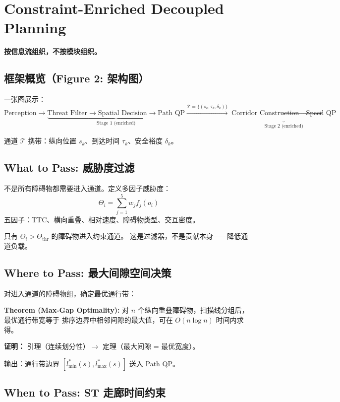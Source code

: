 \documentclass[a4paper,12pt]{article}
\begin{document}
\section{Constraint-Enriched Decoupled Planning}

\textbf{按信息流组织，不按模块组织。}

\subsection{框架概览（Figure 2: 架构图）}

一张图展示：
\[
\text{Perception} \to \underbrace{\text{Threat Filter} \to \text{Spatial Decision} \to \text{Path QP}}_{\text{Stage 1 (enriched)}}
\xrightarrow{\mathcal{T} = \{(s_k, \tau_k, \delta_k)\}}
\underbrace{\text{Corridor Construction} \to \text{Speed QP}}_{\text{Stage 2 (enriched)}}
\]

通道 $\mathcal{T}$ 携带：纵向位置 $s_k$、到达时间 $\tau_k$、安全裕度 $\delta_k$。

\subsection{What to Pass: 威胁度过滤}

不是所有障碍物都需要进入通道。定义多因子威胁度：
\[
\Theta_i = \sum_{j=1}^{5} w_j f_j(o_i)
\]
五因子：TTC、横向重叠、相对速度、障碍物类型、交互密度。

只有 $\Theta_i > \Theta_{\text{thr}}$ 的障碍物进入约束通道。
这是过滤器，不是贡献本身——降低通道负载。

\subsection{Where to Pass: 最大间隙空间决策}

对进入通道的障碍物组，确定最优通行带：

\textbf{Theorem (Max-Gap Optimality):}
对 $n$ 个纵向重叠障碍物，扫描线分组后，最优通行带宽等于
排序边界中相邻间隙的最大值，可在 $O(n \log n)$ 时间内求得。

\textbf{证明：} 引理（连续划分性）$\to$ 定理（最大间隙 = 最优宽度）。

输出：通行带边界 $[l_{\min}^*(s), l_{\max}^*(s)]$ 送入 Path QP。

\subsection{When to Pass: ST 走廊时间约束}
\end{document}
